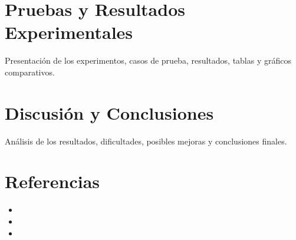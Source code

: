 \documentclass[9pt,letterpaper,onecolumn]{rho-class/rho}
\begin{document}
\section{Pruebas y Resultados Experimentales}
Presentación de los experimentos, casos de prueba, resultados, tablas y gráficos comparativos.

\section{Discusión y Conclusiones}
Análisis de los resultados, dificultades, posibles mejoras y conclusiones finales.

\section{Referencias}
\begin{itemize}
    \item 
    \item 
    \item 
\end{itemize}
\end{document}
